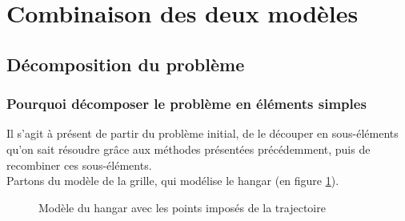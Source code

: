 \section{Combinaison des deux modèles}
\label{combinaison}
\subsection{Décomposition du problème}
\subsubsection{Pourquoi décomposer le problème en éléments simples}
Il s'agit à présent de partir du problème initial, de le découper en sous-éléments qu'on sait résoudre grâce aux méthodes présentées précédemment, puis de recombiner ces sous-éléments.\\
Partons du modèle de la grille, qui modélise le hangar (en figure \ref{fig:grille1}).\\
\begin{figure}[h]
	\centering
	
	\caption{Modèle du hangar avec les points imposés de la trajectoire}
	\label{fig:grille1}
\end{figure}
